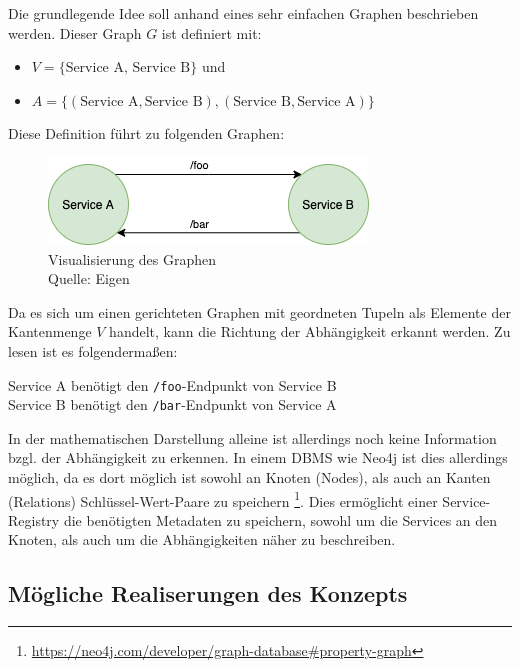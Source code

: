 Die grundlegende Idee soll anhand eines sehr einfachen Graphen beschrieben werden. Dieser Graph $G$ ist definiert mit:
\begin{itemize}
	\item $V = \{\text{Service A, Service B}\}$ und
	\item $A = \{(\text{Service A},\text{Service B}), (\text{Service B}, \text{Service A})\}$
\end{itemize}

Diese Definition führt zu folgenden Graphen:

\begin{figure}[h]
	\centering
	\includegraphics[width=0.65\linewidth]{img/service_dependencies.png}
	\caption[Abbildung eines simplen Abhängigkeitsgraphen]{Visualisierung des Graphen\\Quelle: Eigen}
\end{figure}

Da es sich um einen gerichteten Graphen mit geordneten Tupeln als Elemente der Kantenmenge $V$ handelt, kann die Richtung der Abhängigkeit erkannt werden. Zu lesen ist es folgendermaßen:

\begin{center}
	Service A benötigt den \texttt{/foo}-Endpunkt von Service B\\
	Service B benötigt den \texttt{/bar}-Endpunkt von Service A
\end{center}

In der mathematischen Darstellung alleine ist allerdings noch keine Information bzgl. der Abhängigkeit zu erkennen. In einem \ac{DBMS} wie Neo4j ist dies allerdings möglich, da es dort möglich ist sowohl an Knoten (Nodes), als auch an Kanten (Relations) Schlüssel-Wert-Paare zu speichern \footnote{\url{https://neo4j.com/developer/graph-database\#property-graph}}. Dies ermöglicht einer Service-Registry die benötigten Metadaten zu speichern, sowohl um die Services an den Knoten, als auch um die Abhängigkeiten näher zu beschreiben.

\subsection{Mögliche Realiserungen des Konzepts}

